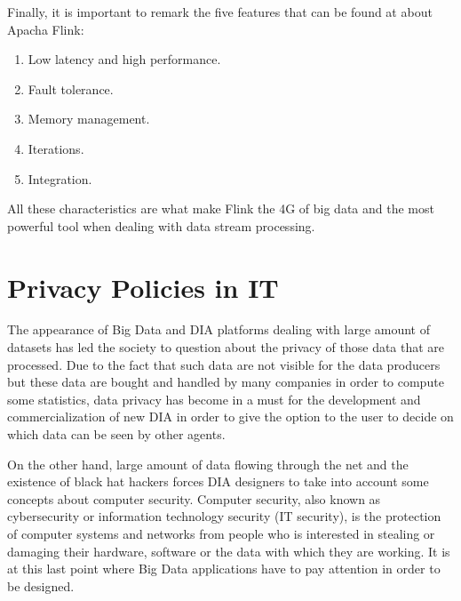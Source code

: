 Finally, it is important to remark the five features that can be found at \cite{flinkwebsite} about Apacha Flink:

\begin{enumerate}

\item Low latency and high performance.
\item Fault tolerance.
\item Memory management.
\item Iterations.
\item Integration.

\end{enumerate}

All these characteristics are what make Flink the 4G of big data and the most powerful tool when dealing with data stream processing.

\section{Privacy Policies in IT}

The appearance of Big Data and DIA platforms dealing with large amount of datasets has led the society to question about the privacy of those data that are processed. Due to the fact that such data are not visible for the data producers but these data are bought and handled by many companies in order to compute some statistics, data privacy has become in a must for the development and commercialization of new DIA in order to give the option to the user to decide on which data can be seen by other agents.

On the other hand, large amount of data flowing through the net and the existence of black hat hackers forces DIA designers to take into account some concepts about computer security. Computer security, also known as cybersecurity or information technology security (IT security), is the protection of computer systems and networks from people who is interested in stealing or damaging their hardware, software or the data with which they are working. It is at this last point where Big Data applications have to pay attention in order to be designed.


